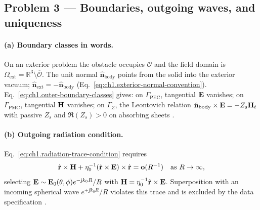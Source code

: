 \subsection*{Problem 3 --- Boundaries, outgoing waves, and uniqueness}

\paragraph{(a) Boundary classes in words.}
On an exterior problem the obstacle occupies $\mathcal{O}$ and the field domain is $\Omega_{\mathrm{ext}}=\mathbb{R}^3\setminus\overline{\mathcal{O}}$. The unit normal $\hat{\mathbf{n}}_{\mathrm{body}}$ points from the solid into the exterior vacuum; $\hat{\mathbf{n}}_{\mathrm{ext}}=-\hat{\mathbf{n}}_{\mathrm{body}}$ (Eq.~\eqref{eq:ch1.exterior-normal-convention}). Eq.~\eqref{eq:ch1.outer-boundary-classes} gives: on $\Gamma_{\mathrm{PEC}}$, tangential $\mathbf{E}$ vanishes; on $\Gamma_{\mathrm{PMC}}$, tangential $\mathbf{H}$ vanishes; on $\Gamma_Z$, the Leontovich relation $\hat{\mathbf{n}}_{\mathrm{body}}\times\mathbf{E}=-Z_s\mathbf{H}_t$ with passive $Z_s$ and $\Re(Z_s)>0$ on absorbing sheets \cite{stratton1941,harrington2001}.

\paragraph{(b) Outgoing radiation condition.}
Eq.~\eqref{eq:ch1.radiation-trace-condition} requires
\[
\hat{\mathbf{r}}\times\mathbf{H}+\eta_0^{-1}(\hat{\mathbf{r}}\times\mathbf{E})\times\hat{\mathbf{r}}=\mathbf{o}(R^{-1})\quad\text{as }R\to\infty,
\]
selecting $\mathbf{E}\sim\mathbf{E}_0(\theta,\phi)e^{-\mathrm{j} k_0 R}/R$ with $\mathbf{H}=\eta_0^{-1}\hat{\mathbf{r}}\times\mathbf{E}$. Superposition with an incoming spherical wave $e^{+\jj k_0 R}/R$ violates this trace and is excluded by the data specification \cite{sommerfeld1949,stratton1941}.

